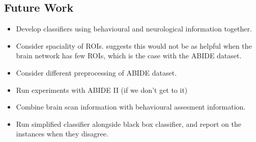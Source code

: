 \documentclass[letterpaper]{article}
\begin{document}
\subsection{Future Work}
\begin{itemize}
    \item Develop classifiers using behavioural and neurological information together.
    \item Consider spaciality of ROIs. \cite{relion2019} suggests this would not be as helpful when the brain network has few ROIs, which is the case with the ABIDE dataset.
    \item Consider different preprocessing of ABIDE dataset.
    \item Run experiments with ABIDE II (if we don't get to it)
    \item Combine brain scan information with behavioural assesment information.
    \item Run simplified classifier alongside black box classifier, and report on the instances when they disagree.
\end{itemize}




\appendix


\end{document}

